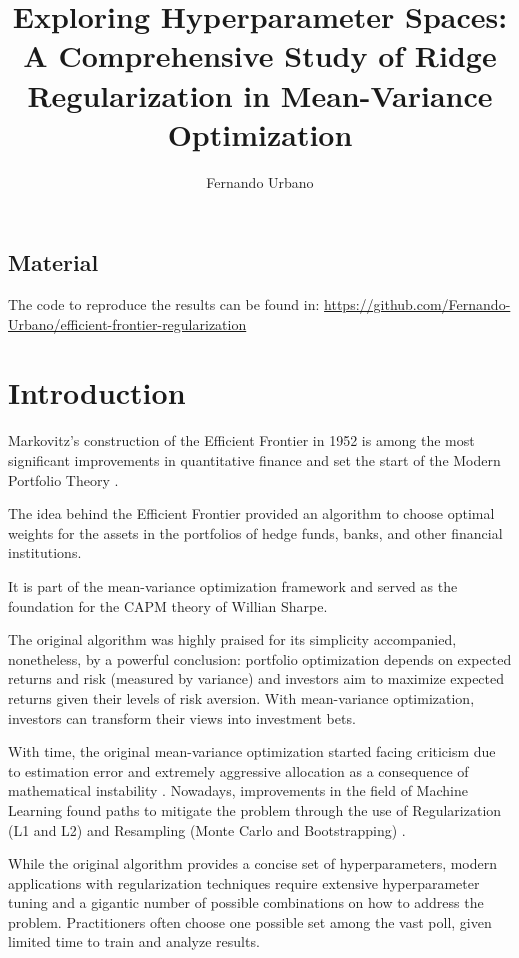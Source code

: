\documentclass{article}
\title{Exploring Hyperparameter Spaces: A Comprehensive Study of Ridge Regularization in Mean-Variance Optimization}
\author{Fernando Urbano}
\begin{document}
\maketitle

\FloatBarrier
\subsection*{Material}
The code to reproduce the results can be found in: \href{https://github.com/Fernando-Urbano/efficient-frontier-regularization}{https://github.com/Fernando-Urbano/efficient-frontier-regularization}

\FloatBarrier
\section{Introduction}

Markovitz's construction of the Efficient Frontier in 1952 is among the most significant improvements in quantitative finance and set the start of the Modern Portfolio Theory \cite{markowitz1952portfolio}.

The idea behind the Efficient Frontier provided an algorithm to choose optimal weights for the assets in the portfolios of hedge funds, banks, and other financial institutions.

It is part of the mean-variance optimization framework and served as the foundation for the CAPM theory of Willian Sharpe.

The original algorithm was highly praised for its simplicity accompanied, nonetheless, by a powerful conclusion: portfolio optimization depends on expected returns and risk (measured by variance) and investors aim to maximize expected returns given their levels of risk aversion. With mean-variance optimization, investors can transform their views into investment bets.

With time, the original mean-variance optimization started facing criticism due to estimation error and extremely aggressive allocation as a consequence of mathematical instability \cite{schmid2018efficient}. Nowadays, improvements in the field of Machine Learning found paths to mitigate the problem through the use of Regularization (L1 and L2) \cite{britten2013robustifying} and Resampling (Monte Carlo and Bootstrapping) \cite{bruder2013regularization}.

While the original algorithm provides a concise set of hyperparameters, modern applications with regularization techniques require extensive hyperparameter tuning and a gigantic number of possible combinations on how to address the problem. Practitioners often choose one possible set among the vast poll, given limited time to train and analyze results.
\end{document}
